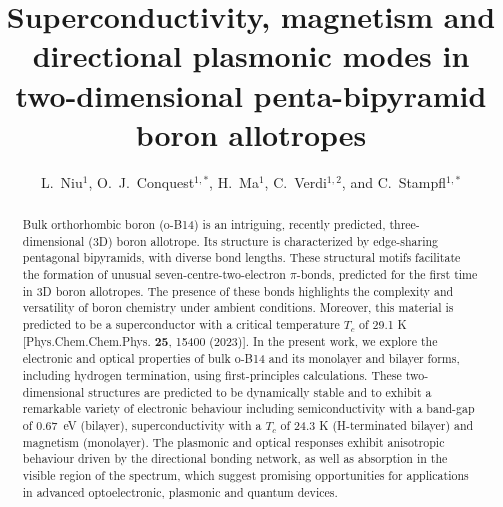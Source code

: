 \documentclass[aps,prb,preprint,notitlepage]{revtex4-2}
\begin{document}
\title{Superconductivity, magnetism and directional plasmonic modes in 
two-dimensional penta-bipyramid boron allotropes} 
\author{L.\ Niu$^{1}$,  O.\ J.\ Conquest$^{1,*}$,  H.\ Ma$^{1}$, C.\ Verdi$^{1,2}$, and C.\ Stampfl$^{1,*}$}
\begin{abstract}
	Bulk orthorhombic boron (o-B14) is an intriguing, recently predicted,
	three-dimensional (3D) boron allotrope. 
	Its structure is characterized by edge-sharing pentagonal bipyramids, with 
	diverse bond lengths. 
	These structural motifs facilitate the formation of unusual seven-centre-two-electron $\pi$-bonds, predicted for the first time in 
	3D boron allotropes. 
	The presence of these bonds highlights the complexity and versatility of boron chemistry under ambient conditions. Moreover, this material
	is predicted to be a superconductor with a critical temperature 
	$T_c$
	of 29.1 K [Phys.Chem.Chem.Phys. {\bf 25}, 15400 (2023)].
In the present work, we explore the electronic and optical properties of bulk o-B14 
and its monolayer and bilayer forms, 
including hydrogen termination, 
	using first-principles calculations. 
	These two-dimensional structures are predicted to be dynamically 
	stable and to exhibit a remarkable variety of electronic behaviour including
	semiconductivity with a band-gap of 0.67~eV (bilayer), 
	superconductivity with a $T_c$ of 24.3 K 
	(H-terminated bilayer) and magnetism (monolayer).
	The plasmonic and optical responses exhibit anisotropic behaviour 
	driven by the directional 
	bonding network, as well as absorption in the visible region of the 
	spectrum, which suggest promising opportunities for applications in
	advanced optoelectronic, plasmonic  and quantum devices.
\end{abstract}

\pacs{}

\maketitle
\def\figurename{FIG.}\def\tablename{TABLE}
\end{document}
